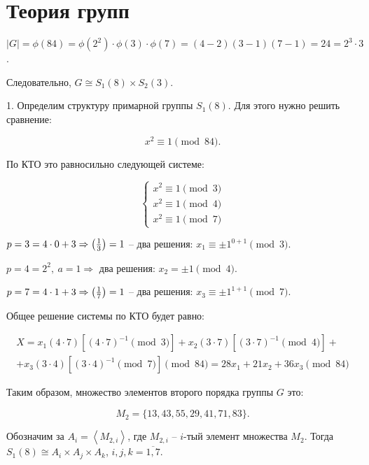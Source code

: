 \section{Теория групп}


$|G| = \phi (84) = \phi (2^2) \cdot \phi (3) \cdot \phi (7) = (4 - 2)(3 - 1)(7 - 1) = 24 = 2^3 \cdot 3$.

\noindent Следовательно, $G \cong S_1(8) \times S_2 (3)$.

1.  Определим структуру примарной группы $S_1(8)$. Для этого нужно решить сравнение:

$$x^2 \equiv 1 \pmod{84}.$$

По КТО это равносильно следующей системе:

\begin{equation*}
	\begin{cases}
	x^2 \equiv 1 \pmod 3 \\
	x^2 \equiv 1 \pmod 4 \\
	x^2 \equiv 1 \pmod 7
	\end{cases}
\end{equation*}

$p = 3 = 4 \cdot 0 + 3 \Rightarrow \left( \frac{1}{3} \right) = 1$ -- два решения: $x_1 \equiv \pm 1^{0+1} \pmod 3$.

$p = 4 = 2^2,\ a = 1 \Rightarrow $ два решения: $x_2 = \pm 1 \pmod 4$.

$p = 7 = 4 \cdot 1 + 3 \Rightarrow \left( \frac{1}{7} \right) = 1$ -- два решения: $x_3 \equiv \pm 1^{1+1} \pmod 7$.

Общее решение системы по КТО будет равно:

\begin{multline*}
X = x_1 (4 \cdot 7)[(4 \cdot 7)^{-1} \pmod 3] + x_2 (3 \cdot 7)[(3 \cdot 7)^{-1} \pmod 4] + \\
+ x_3 (3 \cdot 4)[(3 \cdot 4)^{-1} \pmod 7] \pmod {84} =
28 x_1 + 21 x_2 + 36 x_3 \pmod {84}
\end{multline*}

Таким образом, множество элементов второго порядка группы $G$ это:

$$M_2 = \{13, 43, 55, 29, 41, 71, 83\}.$$

Обозначим за $A_i = \left\langle M_{2, i} \right\rangle $, где $M_{2, i}$ -- $i$-тый элемент множества $M_2$. Тогда $S_1(8) \cong A_i \times A_j \times A_k$, $i, j, k = \overline{1, 7} $.

